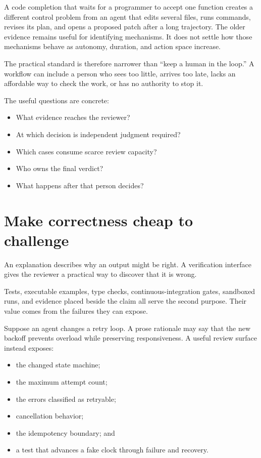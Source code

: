 A code completion that waits for a programmer to accept one function creates a different control problem from an agent that edits several files, runs commands, revises its plan, and opens a proposed patch after a long trajectory. The older evidence remains useful for identifying mechanisms. It does not settle how those mechanisms behave as autonomy, duration, and action space increase.

The practical standard is therefore narrower than ``keep a human in the loop.'' A workflow can include a person who sees too little, arrives too late, lacks an affordable way to check the work, or has no authority to stop it.


The useful questions are concrete:

\begin{itemize}
\tightlist
\item
  What evidence reaches the reviewer?
\item
  At which decision is independent judgment required?
\item
  Which cases consume scarce review capacity?
\item
  Who owns the final verdict?
\item
  What happens after that person decides?
\end{itemize}

\hypertarget{make-correctness-cheap-to-challenge}{%
\section{Make correctness cheap to challenge}\label{make-correctness-cheap-to-challenge}}

An explanation describes why an output might be right. A verification interface gives the reviewer a practical way to discover that it is wrong.

Tests, executable examples, type checks, continuous-integration gates, sandboxed runs, and evidence placed beside the claim all serve the second purpose. Their value comes from the failures they can expose.


Suppose an agent changes a retry loop. A prose rationale may say that the new backoff prevents overload while preserving responsiveness. A useful review surface instead exposes:

\begin{itemize}
\tightlist
\item
  the changed state machine;
\item
  the maximum attempt count;
\item
  the errors classified as retryable;
\item
  cancellation behavior;
\item
  the idempotency boundary; and
\item
  a test that advances a fake clock through failure and recovery.
\end{itemize}

